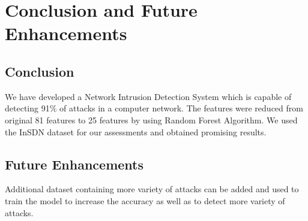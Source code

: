 \chapter{Conclusion and Future Enhancements}
\vspace{-18pt}
\section{Conclusion}
\vspace{-18pt}
We have developed a Network Intrusion Detection System which is capable of detecting 91\% of attacks in a computer network. The features were reduced from original 81 features to 25 features  by using Random Forest Algorithm. We used the InSDN dataset for our assessments and obtained promising results.
\section{Future Enhancements}
\vspace{-18pt}
Additional dataset containing more variety of attacks can be added and used to train the model to increase the accuracy as well as to detect more variety of attacks.
